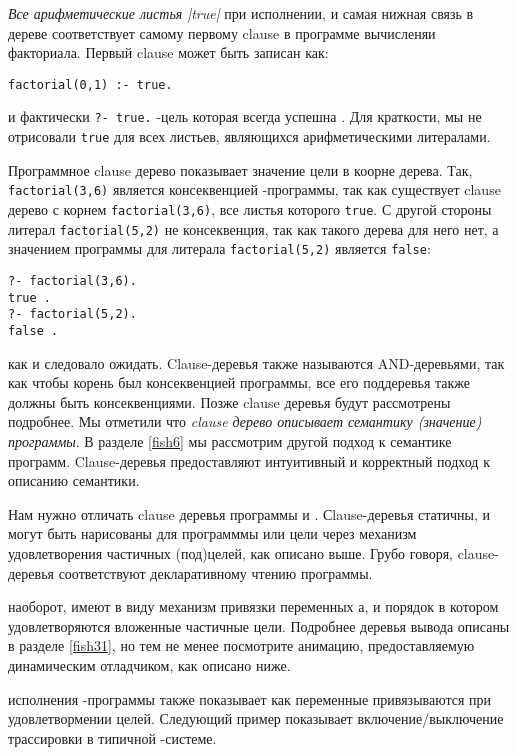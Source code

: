 \emph{Все арифметические листья \var|true|} при исполнении, и самая нижная связь в дереве соответствует
самому первому clause в программе вычисленяи факториала. Первый clause может
быть записан как:

\begin{verbatim}
factorial(0,1) :- true. 
\end{verbatim}
и фактически \verb|?- true.| \prolog-цель которая всегда успешна
. Для краткости, мы не отрисовали
\verb|true| для всех листьев, являющихся арифметическими литералами.

Программное clause дерево показывает значение цели в коорне дерева. Так,\\
\verb'factorial(3,6)' является консеквенцией \prolog-программы, так как
существует clause дерево с корнем \verb'factorial(3,6)', все листья которого
\verb|true|. С другой стороны литерал \verb'factorial(5,2)' не консеквенция,
так как такого дерева для него нет, а значением программы для литерала
\verb'factorial(5,2)' является \verb|false|:

\begin{verbatim}
?- factorial(3,6).  
true .
?- factorial(5,2).  
false . 
\end{verbatim}
как и следовало ожидать. Clause-деревья также называются AND-деревьями, так как
чтобы корень был консеквенцией программы, все его поддеревья также должны быть
консеквенциями. Позже clause деревья будут рассмотрены подробнее. Мы отметили
что \emph{clause дерево описывает семантику (значение) программы}. В разделе
\ref{fish6} мы рассмотрим другой подход к семантике программ. Clause-деревья
предоставляют интуитивный и корректный подход к описанию семантики.

\bigskip

Нам нужно отличать clause деревья программы и . Сlause-деревья статичны, и могут быть нарисованы для
программмы или цели через механизм удовлетворения частичных (под)целей, как
описано выше. Грубо говоря, clause-деревья соответствуют декларативному чтению
программы.

 наоборот, имеют в виду механизм привязки переменных
\prolog а, и порядок в котором удовлетворяются вложенные частичные цели.
Подробнее деревья вывода описаны в разделе \ref{fish31}, но тем не менее
посмотрите анимацию, предоставляемую динамическим отладчиком, как описано ниже.

 исполнения \prolog-программы также показывает
как переменные привязываются при удовлетвормении целей. Следующий пример
показывает включение/выключение трассировки в типичной \prolog-системе.

